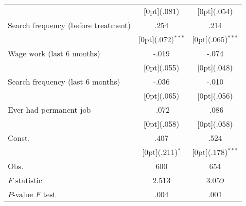 \begin{tabular*}{\textwidth}{@{\extracolsep{\fill}}lcc}
&	\raisebox{.7ex}[0pt]{\scriptsize (.081)} &	\raisebox{.7ex}[0pt]{\scriptsize (.054)} \\
Search frequency (before treatment) &	.254 &	.214 \\
&	\raisebox{.7ex}[0pt]{\scriptsize (.072)$^{***}$} &	\raisebox{.7ex}[0pt]{\scriptsize (.065)$^{***}$} \\
Wage work (last 6 months) &	-.019 &	-.074 \\
&	\raisebox{.7ex}[0pt]{\scriptsize (.055)} &	\raisebox{.7ex}[0pt]{\scriptsize (.048)} \\
Search frequency (last 6 months) &	-.036 &	-.010 \\
&	\raisebox{.7ex}[0pt]{\scriptsize (.065)} &	\raisebox{.7ex}[0pt]{\scriptsize (.056)} \\
Ever had permanent job &	-.072 &	-.086 \\
&	\raisebox{.7ex}[0pt]{\scriptsize (.058)} &	\raisebox{.7ex}[0pt]{\scriptsize (.058)} \\
Const. &	.407 &	.524 \\
&	\raisebox{.7ex}[0pt]{\scriptsize (.211)$^{*}$} &	\raisebox{.7ex}[0pt]{\scriptsize (.178)$^{***}$} \\
\hline	
Obs. &	600 &	654 \\
$F$ statistic &	2.513 &	3.059 \\
$P$-value $F$ test &	 .004 &	.001 \\
\hline		
\end{tabular*}%
